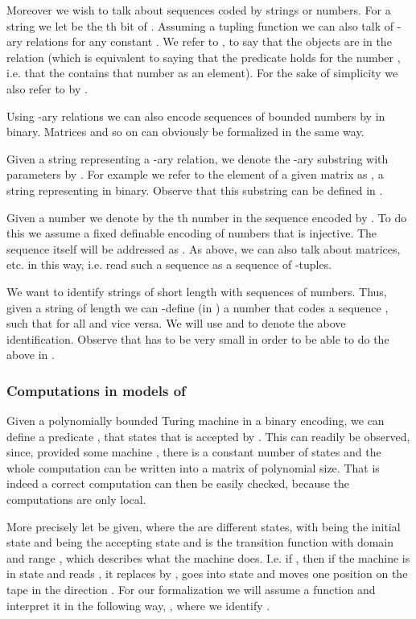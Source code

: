\documentclass{LMCS}
\begin{document}
Moreover we wish to talk about sequences coded by strings or numbers. For a string  we let  be the
th bit of . Assuming a tupling function  we can also talk of -ary
relations for any constant . We refer to , to say that the objects
 are in the relation  (which is equivalent to saying that the predicate  holds for the
number , i.e. that the  contains that number as an element). For the sake
of simplicity we also refer to  by .

Using -ary relations we can also encode sequences of bounded numbers  by  in binary. Matrices and so on can obviously be
formalized in the same way.

Given a string  representing a -ary relation, we denote the -ary
substring with parameters  by .
For example we refer to the element  of a given matrix  as , a string representing  in binary. Observe that
this substring can be  defined in .

Given a number  we denote by  the th number in the  sequence encoded by . To do
this we assume a fixed  definable encoding of numbers that is injective. The sequence itself will be
addressed as . As above, we can also talk about matrices, etc. in this way, i.e. read such a
sequence as a sequence of -tuples.

We want to identify strings of short length with sequences of numbers. Thus, given a string  of length 
we can -define (in ) a number  that codes a sequence , such
that  for all  and vice versa. We will use  and
 to denote the above identification. Observe that  has to be very small in
order to be able to do the above in .


\subsubsection{Computations in models of }\label{Secsub:Comp in VZ}

Given a polynomially bounded Turing machine  in a binary encoding, we can  define a predicate
, that states that  is accepted by . This can readily be observed, since, provided some
machine , there is a constant number of states  and the whole computation can be
written into a matrix  of polynomial size. That  is indeed a correct computation can then be easily
checked, because the computations are only local.

More precisely let  be given, where the  are
different states, with  being the initial state and  being the accepting state and 
is the transition function with domain  and range
, which describes what the
machine does. I.e. if , then if the machine is in state  and reads , it replaces 
by , goes into state  and moves one position on the tape in the direction . For our formalization we
will assume a function  and interpret it in the following way,
, where we identify .
\end{document}
